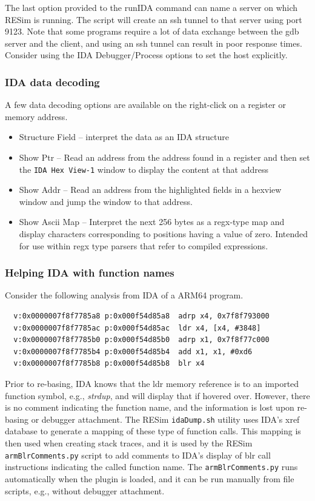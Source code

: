 \documentclass[titlepage]{article}
\begin{document}
The last option provided to the runIDA command can name a server on which RESim is running. The script will create an ssh tunnel to that
server using port 9123.  Note that some programs require a lot of data exchange between the gdb server and the client, and using an ssh 
tunnel can result in poor response times.  Consider using the IDA Debugger/Process options to set the host explicitly.

\subsubsection{IDA data decoding}
A few data decoding options are available on the right-click on a register or memory address.
\begin{itemize}
\item Structure Field -- interpret the data as an IDA structure
\item Show Ptr -- Read an address from the address found in a register and then set the {\tt IDA Hex View-1} window to display the content at that address
\item Show Addr -- Read an address from the highlighted fields in a hexview window and jump the window to that address.
\item Show Ascii Map -- Interpret the next 256 bytes as a regx-type map and display characters corresponding to positions having a value of zero.  Intended
for use within regx type parsers that refer to compiled expressions.
\end{itemize}

\subsubsection{Helping IDA with function names}
Consider the following analysis from IDA of a ARM64 program.
\begin{verbatim}
  v:0x0000007f8f7785a8 p:0x000f54d85a8  adrp x4, 0x7f8f793000
  v:0x0000007f8f7785ac p:0x000f54d85ac  ldr x4, [x4, #3848]
  v:0x0000007f8f7785b0 p:0x000f54d85b0  adrp x1, 0x7f8f77c000
  v:0x0000007f8f7785b4 p:0x000f54d85b4  add x1, x1, #0xd6
  v:0x0000007f8f7785b8 p:0x000f54d85b8  blr x4
\end{verbatim}

Prior to re-basing, IDA knows that the ldr memory reference is to an imported function symbol, e.g., \textit{strdup}, and
will display that if hovered over.  However, there is no comment indicating the function name, and the information is lost
upon re-basing or debugger attachment. 
The RESim {\tt idaDump.sh} utility uses IDA's xref database to generate a mapping of these type of function calls.
This mapping is then used when creating stack traces, and it is used by the RESim {\tt armBlrComments.py} script to add comments
to IDA's display of blr call instructions indicating the called function name.  The {\tt armBlrComments.py} runs automatically when the
plugin is loaded, and it can be run manually from file scripts, e.g., without debugger attachment.
\end{document}
